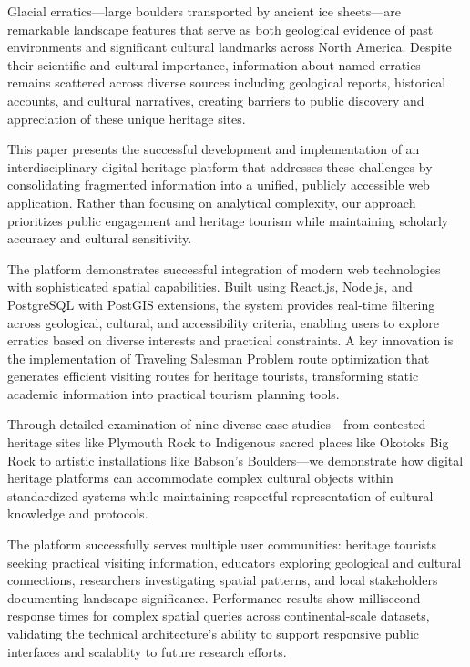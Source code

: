 \documentclass[
11pt, %
english, %
singlespacing, %
headsepline, %
]{MastersDoctoralThesis} %
\begin{document}

\begin{execSummary}
\addchaptertocentry{\execname}
Glacial erratics—large boulders transported by ancient ice sheets—are remarkable landscape features that serve as both geological evidence of past environments and significant cultural landmarks across North America. Despite their scientific and cultural importance, information about named erratics remains scattered across diverse sources including geological reports, historical accounts, and cultural narratives, creating barriers to public discovery and appreciation of these unique heritage sites.

This paper presents the successful development and implementation of an interdisciplinary digital heritage platform that addresses these challenges by consolidating fragmented information into a unified, publicly accessible web application. Rather than focusing on analytical complexity, our approach prioritizes public engagement and heritage tourism while maintaining scholarly accuracy and cultural sensitivity.

The platform demonstrates successful integration of modern web technologies with sophisticated spatial capabilities. Built using React.js, Node.js, and PostgreSQL with PostGIS extensions, the system provides real-time filtering across geological, cultural, and accessibility criteria, enabling users to explore erratics based on diverse interests and practical constraints. A key innovation is the implementation of Traveling Salesman Problem route optimization that generates efficient visiting routes for heritage tourists, transforming static academic information into practical tourism planning tools.

Through detailed examination of nine diverse case studies—from contested heritage sites like Plymouth Rock to Indigenous sacred places like Okotoks Big Rock to artistic installations like Babson's Boulders—we demonstrate how digital heritage platforms can accommodate complex cultural objects within standardized systems while maintaining respectful representation of cultural knowledge and protocols.

The platform successfully serves multiple user communities: heritage tourists seeking practical visiting information, educators exploring geological and cultural connections, researchers investigating spatial patterns, and local stakeholders documenting landscape significance. Performance results show millisecond response times for complex spatial queries across continental-scale datasets, validating the technical architecture's ability to support responsive public interfaces and scalablity to future research efforts.


\end{execSummary}
\end{document}
